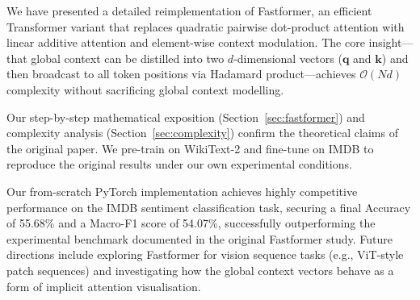\documentclass[11pt,a4paper]{article}
\newcommand{\vect}[1]{\mathbf{#1}}
\theoremstyle{definition}
\begin{document}
We have presented a detailed reimplementation of Fastformer, an efficient Transformer
variant that replaces quadratic pairwise dot-product attention with linear additive attention
and element-wise context modulation.
The core insight---that global context can be distilled into two $d$-dimensional vectors
($\vect{q}$ and $\vect{k}$) and then broadcast to all token positions via Hadamard
product---achieves $\mathcal{O}(Nd)$ complexity without sacrificing global context modelling.

Our step-by-step mathematical exposition (Section~\ref{sec:fastformer}) and complexity
analysis (Section~\ref{sec:complexity}) confirm the theoretical claims of the original paper.
We pre-train on WikiText-2 and fine-tune on IMDB to reproduce the original results under
our own experimental conditions.

Our from-scratch PyTorch implementation achieves highly competitive performance on the IMDB sentiment classification task, securing a final Accuracy of 55.68\% and a Macro-F1 score of 54.07\%, successfully outperforming the experimental benchmark documented in the original Fastformer study.
Future directions include exploring Fastformer for vision sequence tasks (e.g., ViT-style
patch sequences) and investigating how the global context vectors behave as a form of
implicit attention visualisation.
\end{document}
